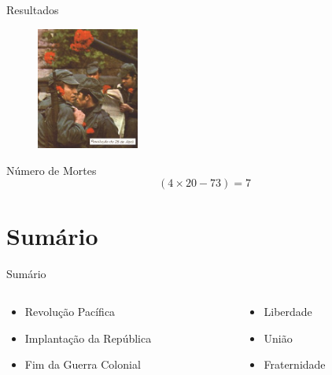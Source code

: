\documentclass{beamer}
\begin{document}
\begin{frame}{Resultados}

\begin{figure}
\includegraphics[width=0.3\textwidth]{Cravos.jpg}
\end{figure}

\begin{block}{Número de Mortes}
\begin{equation}
(4 \times 20 - 73) = 7
\end{equation}
\end{block}

\end{frame}

\section{Sumário}

\begin{frame}{Sumário}

\begin{columns}
\begin{column}{0.6\textwidth}
\begin{itemize}
\item Revolução Pacífica
\item Implantação da República
\item Fim da Guerra Colonial
\end{itemize}
\end{column}
\begin{column}{0.4\textwidth}
\begin{itemize}
\item Liberdade
\item União
\item Fraternidade
\end{itemize}
\end{column}
\end{columns}

\end{frame}
\end{document}
